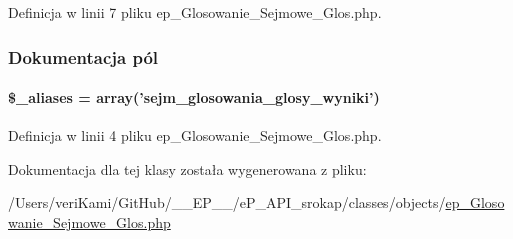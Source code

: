 Definicja w linii 7 pliku ep\-\_\-\-Glosowanie\-\_\-\-Sejmowe\-\_\-\-Glos.\-php.



\subsubsection{Dokumentacja pól}
\hypertarget{classep___glosowanie___sejmowe___glos_ab4e31d75f0bc5d512456911e5d01366b}{
\paragraph[{\$\-\_\-aliases}]{\setlength{\rightskip}{0pt plus 5cm}\$\-\_\-aliases = array('sejm\-\_\-glosowania\-\_\-glosy\-\_\-wyniki')}}\label{classep___glosowanie___sejmowe___glos_ab4e31d75f0bc5d512456911e5d01366b}


Definicja w linii 4 pliku ep\-\_\-\-Glosowanie\-\_\-\-Sejmowe\-\_\-\-Glos.\-php.



Dokumentacja dla tej klasy została wygenerowana z pliku\-:\begin{DoxyCompactItemize}
\item 
/\-Users/veri\-Kami/\-Git\-Hub/\-\_\-\-\_\-\-E\-P\-\_\-\-\_\-/e\-P\-\_\-\-A\-P\-I\-\_\-srokap/classes/objects/\hyperlink{ep___glosowanie___sejmowe___glos_8php}{ep\-\_\-\-Glosowanie\-\_\-\-Sejmowe\-\_\-\-Glos.\-php}\end{DoxyCompactItemize}
